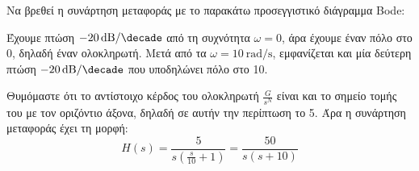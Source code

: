 \documentclass[11pt,a4paper,notitlepage,fleqn,final]{article}
\begin{document}
\begin{exercise}
Να βρεθεί η συνάρτηση μεταφοράς με το παρακάτω προσεγγιστικό διάγραμμα Bode:


\tcblower
Έχουμε πτώση \( \SI{-20}{\decibel/\decade} \) από τη συχνότητα \( \omega = 0 \), άρα έχουμε
έναν πόλο στο 0, δηλαδή έναν ολοκληρωτή. Μετά από τα \( \omega = \SI{10}{\radian/\second} \),
εμφανίζεται και μία δεύτερη πτώση \( \SI{-20}{\decibel/\decade} \) που υποδηλώνει πόλο
στο 10.

Θυμόμαστε ότι το αντίστοιχο κέρδος του ολοκληρωτή \( \frac{G}{s^N} \) είναι και το σημείο τομής του με τον οριζόντιο άξονα, δηλαδή σε αυτήν την περίπτωση το 5. Άρα η συνάρτηση
μεταφοράς έχει τη μορφή:
\[
H(s) = \frac{5}{s\left(\frac{s}{10}+1\right)} = \frac{50}{s(s+10)}
\]
\end{exercise}
\end{document}
